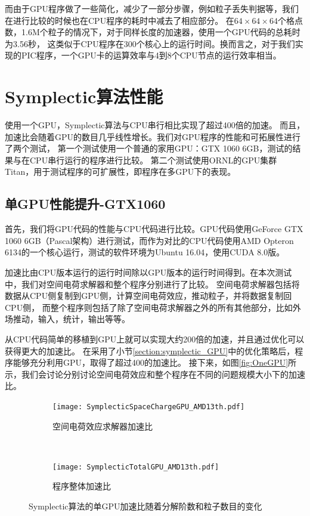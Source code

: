 而由于GPU程序做了一些简化，减少了一部分步骤，例如粒子丢失判据等，我们在进行比较的时候也在CPU程序的耗时中减去了相应部分。
在$64 \times 64 \times 64$个格点数，1.6M个粒子的情况下，对于同样长度的加速器，使用一个GPU代码的总耗时为3.56秒，
这类似于CPU程序在300个核心上的运行时间。换而言之，对于我们实现的PIC程序，一个GPU卡的运算效率与4到8个CPU节点的运行效率相当。


\section{Symplectic算法性能}        \label{section:Symplectic_performance}
使用一个GPU，Symplectic算法与CPU串行相比实现了超过400倍的加速。
而且，加速比会随着GPU的数目几乎线性增长。我们对GPU程序的性能和可拓展性进行了两个测试，
第一个测试使用一个普通的家用GPU：GTX 1060 6GB，测试的结果与在CPU串行运行的程序进行比较。
第二个测试使用ORNL的GPU集群Titan，用于测试程序的可扩展性，即程序在多GPU下的表现。

\subsection{单GPU性能提升-GTX1060}
首先，我们将GPU代码的性能与CPU代码进行比较。GPU代码使用GeForce GTX 1060 6GB（Pascal架构）进行测试，而作为对比的CPU代码使用AMD Opteron 6134的一个核心运行，测试的软件环境为Ubuntu 16.04，使用CUDA 8.0版。

加速比由CPU版本运行的运行时间除以GPU版本的运行时间得到。在本次测试中，我们对空间电荷求解器和整个程序分别进行了比较。
空间电荷求解器包括将数据从CPU侧复制到GPU侧，计算空间电荷效应，推动粒子，并将数据复制回CPU侧，
而整个程序则包括了除了空间电荷求解器之外的所有其他部分，比如外场推动，输入，统计，输出等等。

从CPU代码简单的移植到GPU上就可以实现大约200倍的加速，并且通过优化可以获得更大的加速比。
在采用了小节\eqref{section:symplectic_GPU}中的优化策略后，程序能够充分利用GPU，取得了超过400的加速比。
接下来，如图\eqref{fig:OneGPU}所示，我们会讨论分别讨论空间电荷效应和整个程序在不同的问题规模大小下的加速比。

\begin{figure}[!htb]
    \centering
    \begin{subfigure}[b]{0.9\textwidth}
        \texttt{[image: SymplecticSpaceChargeGPU\_AMD13th.pdf]}
        \caption{空间电荷效应求解器加速比}
        \label{fig:SCOpt}
    \end{subfigure}
    \quad
    ~ %
    \begin{subfigure}[b]{0.9\textwidth}
        \texttt{[image: SymplecticTotalGPU\_AMD13th.pdf]}
        \caption{程序整体加速比}
        \label{fig:TotalOpt}
    \end{subfigure}
    \caption{Symplectic算法的单GPU加速比随着分解阶数和粒子数目的变化}\label{fig:OneGPU}
\end{figure}

